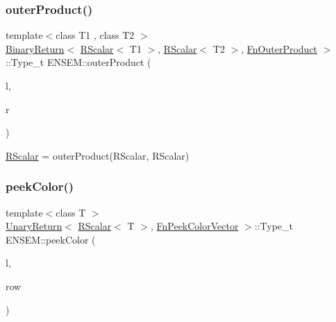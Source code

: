 \mbox{\label{group__rscalar_ga15f13b29160f342d113127c8d71db613}} 
\subsubsection{\texorpdfstring{outerProduct()}{outerProduct()}}
{\footnotesize\ttfamily template$<$class T1 , class T2 $>$ \\
\mbox{\hyperlink{structENSEM_1_1BinaryReturn}{Binary\+Return}}$<$ \mbox{\hyperlink{classENSEM_1_1RScalar}{R\+Scalar}}$<$ T1 $>$, \mbox{\hyperlink{classENSEM_1_1RScalar}{R\+Scalar}}$<$ T2 $>$, \mbox{\hyperlink{structENSEM_1_1FnOuterProduct}{Fn\+Outer\+Product}} $>$\+::Type\+\_\+t E\+N\+S\+E\+M\+::outer\+Product (\begin{DoxyParamCaption}\item[{const \mbox{\hyperlink{classENSEM_1_1RScalar}{R\+Scalar}}$<$ T1 $>$ \&}]{l,  }\item[{const \mbox{\hyperlink{classENSEM_1_1RScalar}{R\+Scalar}}$<$ T2 $>$ \&}]{r }\end{DoxyParamCaption})\hspace{0.3cm}{\ttfamily [inline]}}



\mbox{\hyperlink{classENSEM_1_1RScalar}{R\+Scalar}} = outer\+Product(\+R\+Scalar, R\+Scalar) 

\mbox{\label{group__rscalar_ga9ab62185b545eeb3c9cad28b0c200430}} 
\subsubsection{\texorpdfstring{peekColor()}{peekColor()}\hspace{0.1cm}{\footnotesize\ttfamily [1/2]}}
{\footnotesize\ttfamily template$<$class T $>$ \\
\mbox{\hyperlink{structENSEM_1_1UnaryReturn}{Unary\+Return}}$<$ \mbox{\hyperlink{classENSEM_1_1RScalar}{R\+Scalar}}$<$ T $>$, \mbox{\hyperlink{structENSEM_1_1FnPeekColorVector}{Fn\+Peek\+Color\+Vector}} $>$\+::Type\+\_\+t E\+N\+S\+E\+M\+::peek\+Color (\begin{DoxyParamCaption}\item[{const \mbox{\hyperlink{classENSEM_1_1RScalar}{R\+Scalar}}$<$ T $>$ \&}]{l,  }\item[{int}]{row }\end{DoxyParamCaption})\hspace{0.3cm}{\ttfamily [inline]}}



